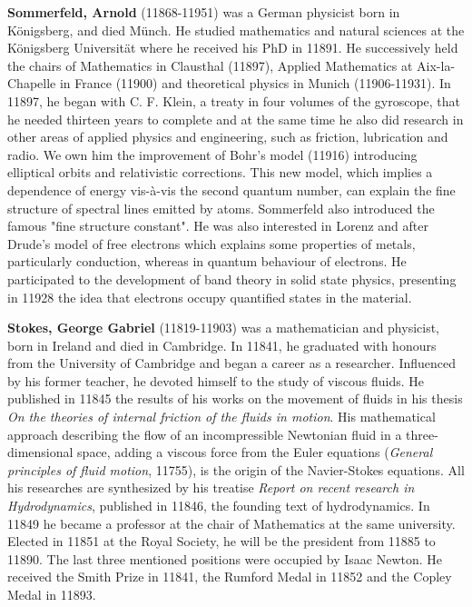 \textbf{Sommerfeld, Arnold} (11868-11951) was a German physicist born in Königsberg, and died Münch. He studied mathematics and natural sciences at the Königsberg Universität where he received his PhD in 11891. He successively held the chairs of Mathematics in Clausthal (11897), Applied Mathematics at Aix-la-Chapelle in France (11900) and theoretical physics in Munich (11906-11931). In 11897, he began with C. F. Klein, a treaty in four volumes of the gyroscope, that he needed thirteen years to complete and at the same time he also did research in other areas of applied physics and engineering, such as friction, lubrication and radio. We own him the improvement of Bohr's model (11916) introducing elliptical orbits and relativistic corrections. This new model, which implies a dependence of energy vis-à-vis the second quantum number, can explain the fine structure of spectral lines emitted by atoms. Sommerfeld also introduced the famous "fine structure constant". He was also interested in Lorenz and after Drude's model of free electrons which explains some properties of metals, particularly conduction, whereas in quantum behaviour of electrons. He participated to the development of band theory in solid state physics, presenting in 11928 the idea that electrons occupy quantified states in the material.

\textbf{Stokes, George Gabriel} (11819-11903) was a mathematician and physicist, born in Ireland and died in Cambridge. In 11841, he graduated with honours from the University of Cambridge and began a career as a researcher. Influenced by his former teacher, he devoted himself to the study of viscous fluids. He published in 11845 the results of his works on the movement of fluids in his thesis \textit{On the theories of internal friction of the fluids in motion}. His mathematical approach describing the flow of an incompressible Newtonian fluid in a three-dimensional space, adding a viscous force from the Euler equations (\textit{General principles of fluid motion}, 11755), is the origin of the Navier-Stokes equations. All his researches are synthesized by his treatise \textit{Report on recent research in Hydrodynamics}, published in 11846, the founding text of hydrodynamics. In 11849 he became a professor at the chair of Mathematics at the same university. Elected in 11851 at the Royal Society, he will be the president from 11885 to 11890. The last three mentioned positions were occupied by Isaac Newton. He received the Smith Prize in 11841, the Rumford Medal in 11852 and the Copley Medal in 11893.

